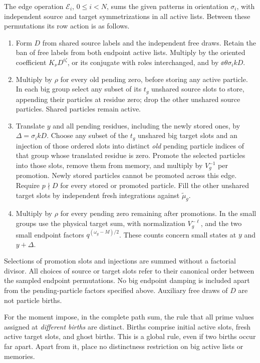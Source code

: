 The edge operation $\mathcal E_i$, $0\le i<N$, sums the given
patterns in orientation $\sigma_i$, with independent source
and target symmetrizations in all active lists.  Between these
permutations its row action is as follows.
\begin{enumerate}
\item Form $D$ from shared source labels and the independent free
draws.  Retain the ban of free labels from both endpoint active
lists.  Multiply by the oriented coefficient
$K_\nu D^{i\zeta}$, or its conjugate with roles interchanged,
and by $\ee{\theta\sigma_i kD}$.
\item Multiply by $\rho$ for every old pending zero, before
storing any active particle.  In each big group select any
subset of its $t_g$ unshared source slots to store, appending
their particles at residue zero; drop the other unshared source
particles.  Shared particles remain active.
\item Translate $y$ and all pending residues, including the
newly stored ones, by $\Delta=\sigma_i kD$.
Choose any subset of the $t_g$ unshared big target slots and
an injection of those ordered slots into distinct \emph{old}
pending particle indices of that group whose translated residue
is zero.  Promote the selected particles into those slots,
remove them from memory, and multiply by $V_g^{-1}$ per
promotion.  Newly stored particles cannot be promoted across
this edge.  Require $p\nmid D$ for every stored or promoted
particle.  Fill the other unshared target slots by independent
fresh integrations against $\widetilde\mu_g$.
\item Multiply by $\rho$ for every pending zero remaining after
promotions.  In the small groups use the physical target sum,
with normalization $V_g^{-\ell}$, and the two small endpoint
factors $q^{(\omega_g-M)/2}$.  These counts concern small states
at $y$ and $y+\Delta$.
\end{enumerate}
Selections of promotion slots and injections are summed without
a factorial divisor.  All choices of source or target slots
refer to their canonical order between the sampled endpoint
permutations.  No big endpoint damping is included apart from
the pending-particle factors specified above.  Auxiliary free
draws of $D$ are not particle births.

For the moment impose, in the complete path sum, the rule that
all prime values assigned at \emph{different births} are
distinct.  Births comprise initial active slots, fresh active
target slots, and ghost births.  This is a global rule, even
if two births occur far apart.  Apart from it, place no
distinctness restriction on big active lists or memories.

